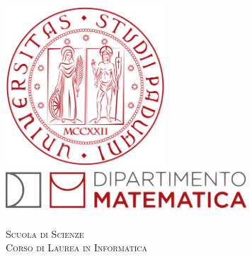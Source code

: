 \begin{titlepage}
    
    \newcommand{\HRule}{\rule{\linewidth}{0.5mm}} 
    
    \center
    
    
    
    \begin{LARGE}
        \textsc{\textbf{\myUni}}\\[1cm] 
    \end{LARGE}
    
    
    \includegraphics[height=6cm]{immagini/logo-unipd.png}\\[1cm]
    
    \includegraphics[height=1.5cm, width = 9cm]{immagini/MathDip.png}\\
    \textsc{\myDepartment}\\[1cm]
    
    \textsc{\Large Scuola di Scienze}\\[0.5cm] 
    
    \textsc{\large Corso di Laurea in Informatica}\\[0.5cm] 
    

\end{titlepage}
